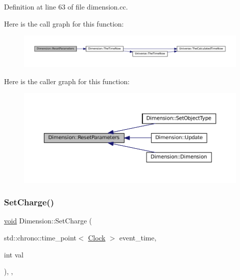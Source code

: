Definition at line 63 of file dimension.\+cc.

Here is the call graph for this function\+:\nopagebreak
\begin{figure}[H]
\begin{center}
\leavevmode
\includegraphics[width=350pt]{class_dimension_af83732dba929ae01aca457e7d6121374_cgraph}
\end{center}
\end{figure}
Here is the caller graph for this function\+:\nopagebreak
\begin{figure}[H]
\begin{center}
\leavevmode
\includegraphics[width=350pt]{class_dimension_af83732dba929ae01aca457e7d6121374_icgraph}
\end{center}
\end{figure}
\mbox{\label{class_dimension_a6d3f7fa4a26b92d8ae6161a1b8bb8220}} 
\subsubsection{\texorpdfstring{Set\+Charge()}{SetCharge()}}
{\footnotesize\ttfamily \mbox{\hyperlink{glad_8h_a950fc91edb4504f62f1c577bf4727c29}{void}} Dimension\+::\+Set\+Charge (\begin{DoxyParamCaption}\item[{std\+::chrono\+::time\+\_\+point$<$ \mbox{\hyperlink{universe_8h_a0ef8d951d1ca5ab3cfaf7ab4c7a6fd80}{Clock}} $>$}]{event\+\_\+time,  }\item[{int}]{val }\end{DoxyParamCaption})\hspace{0.3cm}{\ttfamily [inline]}, {\ttfamily [final]}, {\ttfamily [virtual]}}



